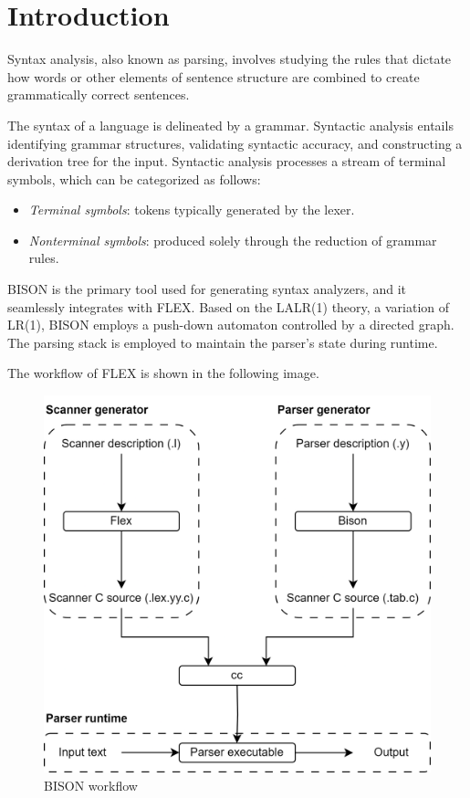 \section{Introduction}

\begin{definition}
    Syntax analysis, also known as parsing, involves studying the rules that dictate how words or other elements of sentence structure are combined to create grammatically correct sentences.
\end{definition}
The syntax of a language is delineated by a grammar. 
Syntactic analysis entails identifying grammar structures, validating syntactic accuracy, and constructing a derivation tree for the input.
Syntactic analysis processes a stream of terminal symbols, which can be categorized as follows:
\begin{itemize}
    \item \textit{Terminal symbols}: tokens typically generated by the lexer.
    \item \textit{Nonterminal symbols}: produced solely through the reduction of grammar rules.
\end{itemize}

BISON is the primary tool used for generating syntax analyzers, and it seamlessly integrates with FLEX.
Based on the LALR(1) theory, a variation of LR(1), BISON employs a push-down automaton controlled by a directed graph. 
The parsing stack is employed to maintain the parser's state during runtime.

The workflow of FLEX is shown in the following image. 
\begin{figure}[H]
    \centering
    \includegraphics[width=0.39\linewidth]{images/bison.png}
    \caption{BISON workflow}
\end{figure}